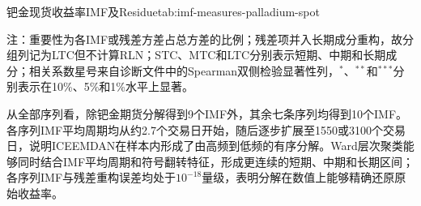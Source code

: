 \documentclass[UTF8,zihao=-4,fontset=fandol]{ctexart}
\begin{document}
\begin{center}
\begin{imfmeasurecell}{钯金现货收益率IMF及Residue}{tab:imf-measures-palladium-spot}
\end{imfmeasurecell}
\end{center}

\begin{flushleft}
{\songti{}注：重要性为各IMF或残差方差占总方差的比例；残差项并入长期成分重构，故分组列记为LTC但不计算RLN；STC、MTC和LTC分别表示短期、中期和长期成分；相关系数星号来自诊断文件中的Spearman双侧检验显著性列，$^{*}$、$^{**}$和$^{***}$分别表示在10\%、5\%和1\%水平上显著。}
\end{flushleft}

从全部序列看，除钯金期货分解得到9个IMF外，其余七条序列均得到10个IMF。各序列IMF平均周期均从约2.7个交易日开始，随后逐步扩展至1550或3100个交易日，说明ICEEMDAN在样本内形成了由高频到低频的有序分解。Ward层次聚类能够同时结合IMF平均周期和符号翻转特征，形成更连续的短期、中期和长期区间；各序列IMF与残差重构误差均处于$10^{-18}$量级，表明分解在数值上能够精确还原原始收益率。
\end{document}
